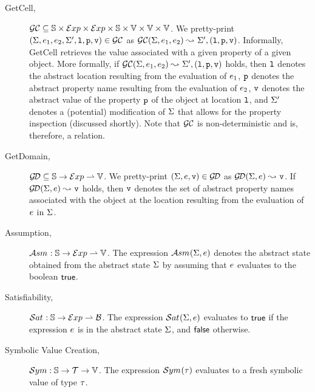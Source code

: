 \begin{description}
  
  \item[GetCell,] $\mathcal{GC} \subseteq \mathbb{S} \times \mathcal{E}xp \times \mathcal{E}xp \times \mathbb{S} \times \mathbb{V} \times \mathbb{V} \times \mathbb{V}$. 
          We pretty-print $(\Sigma, e_1, e_2, \Sigma', \mathtt{l}, \mathtt{p}, \mathtt{v}) \in \mathcal{GC}$ as $\mathcal{GC}(\Sigma, e_1, e_2) \leadsto_{} \Sigma', (\mathtt{l}, \mathtt{p}, \mathtt{v})$. 
          Informally, GetCell retrieves the value associated with a given property of a given object. More formally, if $\mathcal{GC}(\Sigma, e_1, e_2) \leadsto_{} \Sigma', (\mathtt{l}, \mathtt{p}, \mathtt{v})$ holds, 
          then  $\mathtt{l}$ denotes the abstract location resulting from the evaluation of $e_1$, 
           $\mathtt{p}$ denotes the abstract property name resulting from the evaluation of $e_2$, 
           $\mathtt{v}$ denotes the abstract value of the property $\mathtt{p}$ of the object at location $\mathtt{l}$, 
          and  $\Sigma'$ denotes a (potential) modification of $\Sigma$ that allows for the property inspection (discussed shortly). 
          Note that $\mathcal{GC}$ is non-deterministic and is, therefore, a relation.
             
  \item[GetDomain,] $\mathcal{G\!D} \subseteq \mathbb{S} \rightarrow \mathcal{E}xp \rightharpoonup \mathbb{V}$. 
           We pretty-print $(\Sigma, e, \mathtt{v}) \in \mathcal{G\!D}$ as $\mathcal{G\!D}(\Sigma, e) \leadsto_{} \mathtt{v}$. 
           If $\mathcal{G\!D}(\Sigma, e) \leadsto_{} \mathtt{v}$ holds, then $\mathtt{v}$ denotes the 
           set of abstract property names associated with the object at the location resulting from the evaluation of $e$ 
           in $\Sigma$. 
   
   \item[Assumption,] $\mathcal{A}{sm}_{} : \mathbb{S} \rightarrow \mathcal{E}xp \rightharpoonup \mathbb{V}$. 
            The expression $\mathcal{A}{sm}_{}(\Sigma, e)$ denotes the abstract state obtained from the 
            abstract state $\Sigma$ by assuming that $e$ evaluates to the boolean ${\sf true}$. 
  
   \item[Satisfiability,] $\mathcal{S}at_{} : \mathbb{S} \rightarrow \mathcal{E}xp \rightharpoonup \mathcal{B}$. 
            The expression $\mathcal{S}at_{}(\Sigma, e)$ evaluates to ${\sf true}$ if the \jsil expression $e$ is  in the abstract 
            state $\Sigma$, and ${\sf false}$ otherwise.
             
   \item[Symbolic Value Creation,] $\mathcal{S}ym : \mathbb{S} \rightarrow \mathcal{T} \rightarrow \mathbb{V}$. 
            The expression $\mathcal{S}ym_{}(\tau)$ evaluates to a fresh symbolic value of type $\tau$.
\end{description}

